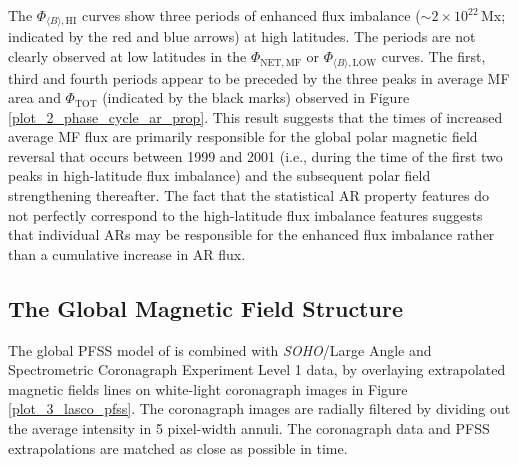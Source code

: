 \documentclass[namedreferences]{solarphysics}
\begin{document}
\begin{article}
The $\Phi_{\langle B \rangle,\mathrm{HI}}$ curves show three periods of enhanced flux imbalance ($\sim$$2\times10^{22}$\,Mx; indicated by the red and blue arrows) at high latitudes. The periods are not clearly observed at low latitudes in the $\Phi_{\mathrm{NET,MF}}$ or $\Phi_{\langle B \rangle,\mathrm{LOW}}$ curves. The first, third and fourth periods appear to be preceded by the three peaks in average MF area and $\Phi_\mathrm{TOT}$ (indicated by the black marks) observed in Figure\,\ref{plot_2_phase_cycle_ar_prop}. This result suggests that the times of increased average MF flux are primarily responsible for the global polar magnetic field reversal that occurs between 1999 and 2001 (i.e., during the time of the first two peaks in high-latitude flux imbalance) and the subsequent polar field strengthening thereafter. The fact that the statistical AR property features do not perfectly correspond to the high-latitude flux imbalance features suggests that individual ARs may be responsible for the enhanced flux imbalance rather than a cumulative increase in AR flux. 


\subsection{The Global Magnetic Field Structure}


The global PFSS model of \citet{Schrijver:2003} is combined with \emph{SOHO}/Large Angle and Spectrometric Coronagraph Experiment \citep[LASCO;][]{brueckner:1995} Level 1 data, by overlaying extrapolated magnetic fields lines on white-light coronagraph images in Figure\,\ref{plot_3_lasco_pfss}. The coronagraph images are radially filtered by dividing out the average intensity in 5 pixel-width annuli. The coronagraph data and PFSS extrapolations are matched as close as possible in time. 


\end{article}
\end{document}
